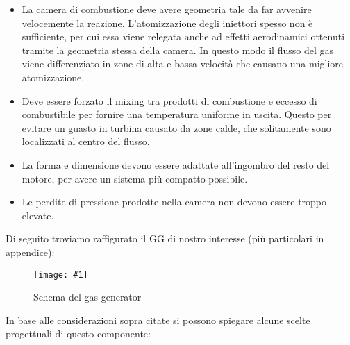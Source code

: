 \documentclass[11pt,a4paper]{article}
\newcommand{\cfig}[4]{
\begin{figure}[H]
	\centering
	\texttt{[image: \#1]}
	\caption{#2}
	\label{fig:#3}
\end{figure}
}
\begin{document}
\begin{itemize}[wide,itemsep=3pt,topsep=3pt]

\item
La camera di combustione deve avere geometria tale da far avvenire velocemente la reazione. L’atomizzazione degli iniettori spesso non è sufficiente, per cui essa viene relegata anche ad effetti aerodinamici ottenuti tramite la geometria stessa della camera. In questo modo il flusso del gas viene differenziato in zone di alta e bassa velocità che causano una migliore atomizzazione.
\item
Deve essere forzato il mixing tra prodotti di combustione e eccesso di combustibile per fornire una temperatura uniforme in uscita. Questo per evitare un guasto in turbina causato da zone calde, che solitamente sono localizzati al centro del flusso. 
\item
La forma e dimensione devono essere adattate all'ingombro del resto del motore, per avere un sistema più compatto possibile.
\item
Le perdite di pressione prodotte nella camera non devono essere troppo elevate. 

\end{itemize}

Di seguito troviamo raffigurato il GG di nostro interesse (più particolari in appendice):

\cfig{GG_schema}{Schema del gas generator}{schema_gg}{0.48}


In base alle considerazioni sopra citate si possono spiegare alcune scelte progettuali di questo componente:
\end{document}
